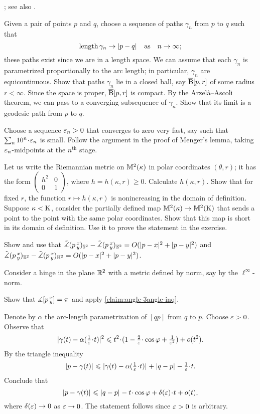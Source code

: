  \cite[Corollary]{hu-kirk}; see also \cite[Lemma 2.3]{petrunin-stadler}.

Given a pair of points $p$ and $q$, choose a sequence of paths $\gamma_n$ from $p$ to $q$ such that
\[\length\gamma_n\to \dist pq{}
\quad\text{as}\quad
n\to\infty;\]
these paths exist since we are in a length space.
We can assume that each $\gamma_n$ is parametrized proportionally to the arc length;
in particular, $\gamma_n$ are equicontinuous.
Show that paths $\gamma_n$ lie in a closed ball, say $\cBall[p,r]$ of some radius $r<\infty$.
Since the space is proper, $\cBall[p,r]$ is compact.
By the Arzelà--Ascoli theorem, we can pass to a converging subsequence of $\gamma_n$.
Show that its limit is a geodesic path from $p$ to $q$.

Choose a sequence $\eps_n>0$ that converges to zero very fast, say such that $\sum_n10^n\cdot \eps_n$ is small.
Follow the argument in the proof of Menger's lemma, taking $\eps_n$-midpoints at the $n^{\text{th}}$ stage.

Let us write the Riemannian metric on $\MM^2(\kappa)$ in polar coordinates $(\theta,r)$;
it has the form 
$(\begin{smallmatrix}
h^2&0
\\
0&1
\end{smallmatrix})$, where $h=h(\kappa,r)\ge 0$.
Calculate $h(\kappa,r)$.
Show that for fixed $r$, the function $r\mapsto h(\kappa,r)$ is nonincreasing in the domain of definition.
Suppose $\kappa<\Kappa$, consider the partially defined map $\MM^2(\kappa)\to\MM^2(\Kappa)$ that sends a point to the point with the same polar coordinates.
Show that this map is short in its domain of definition.
Use it to prove the statement in the exercise.


 Show and use that 
$\angk p{x}{y}_{\SSS^2}-\angk p{x}{y}_{\EE^2}=O(\dist[2]{p}{x}{}+\dist[2]{p}{y}{})$
and 
$\angk p{x}{y}_{\EE^2}-\angk p{x}{y}_{\HH^2}=O(\dist[2]{p}{x}{}+\dist[2]{p}{y}{})$.

Consider a hinge in the plane $\RR^2$ with a metric defined by norm, say by the $\ell^\infty$-norm.

Show that $\mangle\hinge pxy=\pi$ and apply \ref{claim:angle-3angle-inq}.

Denote by $\alpha$ the arc-length parametrization of $[qp]$ from $q$ to $p$.
Choose $\eps>0$.
Observe that 
\[\dist[2]{\gamma(t)}{\alpha(\tfrac1\eps\cdot t)}{}\le t^2\cdot(1-\tfrac2\eps\cdot\cos\phi+\tfrac1{\eps^2})+o(t^2).\]
By the triangle  inequality
\[\dist{p}{\gamma(t)}{}\le \dist{\gamma(t)}{\alpha(\tfrac1\eps\cdot t)}{}+\dist{q}{p}{}-\tfrac1\eps\cdot t.\]
Conclude that
\[\dist{p}{\gamma(t)}{}
\le
\dist{q}{p}{}-t\cdot \cos \phi+\delta(\eps)\cdot t+o(t),\]
where $\delta(\eps)\to 0$ as $\eps\to0$.
The statement follows since $\eps>0$ is arbitrary.

